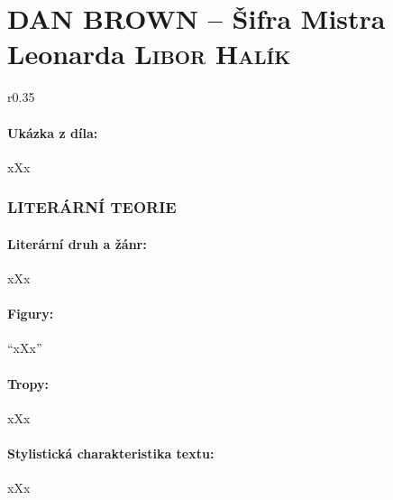 \documentclass[A4paper]{extarticle} %
\begin{document}
\newpage


\changefontsize{8pt}

\part*{DAN BROWN -- Šifra Mistra Leonarda {\hfill \normalfont\tiny\textsc{Libor Halík}}}

\noindent\begin{wrapfigure}{r}{0.35\textwidth}
\tiny

\subsection*{Ukázka z díla:}
\setlength{\parindent}{3pt}
xXx
\end{wrapfigure}

\section*{LITERÁRNÍ TEORIE}

\subsection*{Literární druh a žánr:}
\noindent xXx



\subsection*{Figury:}
\noindent 
\enquote{xXx}

\subsection*{Tropy:}
\noindent 
xXx

\subsection*{Stylistická charakteristika textu:}
\noindent 
xXx
\end{document}
